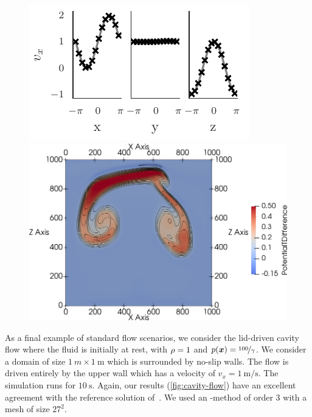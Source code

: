 \documentclass[runningheads]{llncs}
\begin{document}
\begin{figure}[tb]
\centering
\begin{minipage}[t]{.473\textwidth}
  \centering
    \includegraphics{paper_abc_flow_velocity}
\end{minipage}\qquad%
\begin{minipage}[t]{.473\textwidth}
  \centering
    \includegraphics[width=\textwidth]{paper_two_bubbles_fv}
\end{minipage}
\end{figure}

As a final example of standard flow scenarios, we consider the lid-driven cavity flow where the fluid is initially at rest, with $\rho = 1$ and $ p(\bm{x}) = \nicefrac{100}{\gamma}$.
We consider a domain of size $\SI{1}{m} \times \SI{1}{\m}$ which is surrounded by no-slip walls.
The flow is driven entirely by the upper wall which has a velocity of $v_x = \SI{1}{\m/\s}$.
The simulation runs for $\SI{10}{\s}$.
Again, our results (\cref{fig:cavity-flow}) have an excellent agreement with the reference solution of~\cite{ghia1982high}.
We used an \aderdg{}-method of order $3$ with a mesh of size $27^2$.
\end{document}

